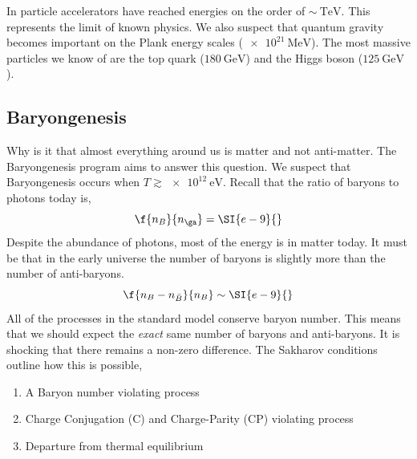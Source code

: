 \documentclass{article}
\begin{document}
\begin{center}
\end{center}

In particle accelerators have reached energies on the order of $\sim\SI{}{\tera \eV}$. This represents the limit of known physics. We also suspect that quantum gravity becomes important on the Plank energy scales ($\SI{e21}{\mega \eV}$). The most massive particles we know of are the top quark ($\SI{180}{\giga \eV}$) and the Higgs boson ($\SI{125}{\giga \eV}$).

\subsection{Baryongenesis}
Why is it that almost everything around us is matter and not anti-matter. The Baryongenesis program aims to answer this question. We suspect that Baryongenesis occurs when $T \gtrsim \SI{e12}{\eV}$. Recall that the ratio of baryons to photons today is,
\[ \f{n_B}{n_\ga} = \SI{e-9}{} \]
Despite the abundance of photons, most of the energy is in matter today. It must be that in the early universe the number of baryons is slightly more than the number of anti-baryons.
\[ \f{n_B - n_{\bar B}}{n_B} \sim \SI{e-9}{} \]
All of the processes in the standard model conserve baryon number. This means that we should expect the \textit{exact} same number of baryons and anti-baryons. It is shocking that there remains a non-zero difference. The Sakharov conditions outline how this is possible,
\begin{enumerate}
    \item A Baryon number violating process
    \item Charge Conjugation (C) and Charge-Parity (CP) violating process
    \item Departure from thermal equilibrium
\end{enumerate}
\end{document}
